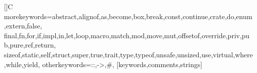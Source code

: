 []{C}{%
  morekeywords={abstract,alignof,as,become,box,break,const,continue,crate,do,enum,extern,false,
  final,fn,for,if,impl,in,let,loop,macro,match,mod,move,mut,offsetof,override,priv,pub,pure,ref,return,
  sizeof,static,self,struct,super,true,trait,type,typeof,unsafe,unsized,use,virtual,where,while,yield},
  otherkeywords={::,->,\#},
}[keywords,comments,strings]%
